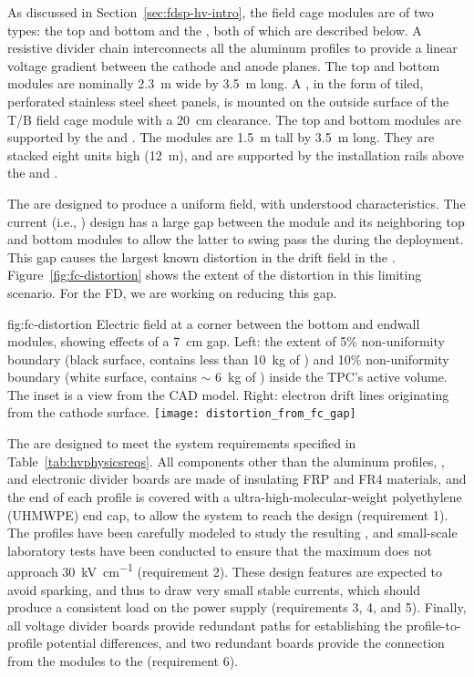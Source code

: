 As discussed in Section~\ref{sec:fdsp-hv-intro}, %
the field cage modules are of two types: the top and bottom  and the , both of which are described below. 
A resistive divider chain interconnects all the aluminum profiles to provide a linear voltage gradient between the cathode and anode planes.  The top and bottom modules are nominally \SI{2.3}{\m} wide by \SI{3.5}{\m} long. A , in the form of tiled, perforated stainless steel sheet panels, is mounted on the outside surface of the T/B field cage module with a \SI{20}{\cm} clearance. The top and bottom  modules are supported by the  and . The  modules are \SI{1.5}{\m} tall by \SI{3.5}{\m} long. They are stacked eight units high (\SI{12}{\m}), and are supported by the installation rails above the  and .

The  are designed to produce a uniform field, with understood characteristics.
The current (i.e., )  design has a large gap between the  module and its neighboring top and bottom modules to allow the latter to swing pass the  during the  deployment. This gap causes the largest known distortion in the drift field in the . Figure~\ref{fig:fc-distortion} shows the extent of the distortion in this limiting scenario. For the FD, we are working on reducing this gap.

\begin{dunefigure}
{fig:fc-distortion}
{Electric field at a corner between the bottom and endwall  modules, showing effects of a \SI{7}{cm} gap. Left: the extent of \num{5}\% \efield{} non-uniformity boundary (black surface, contains less than \SI{10}{kg} of \lar) and \num{10}\% non-uniformity boundary (white surface, contains $\sim$ \SI{6}{kg} of \lar) inside the TPC's active volume. The inset is a view from the CAD model.  Right: electron drift lines originating from the cathode surface.}
\texttt{[image: distortion\_from\_fc\_gap]}
\end{dunefigure}

The  %
are designed to %
meet the system requirements specified in Table~\ref{tab:hvphysicsreqs}. All components other than the aluminum profiles, , and electronic divider boards are made of insulating FRP and FR4 materials, and the end of each profile is covered with a ultra-high-molecular-weight polyethylene (UHMWPE) end cap, to allow the system to reach the design  \efield{} (requirement 1). The profiles have been carefully modeled to study the resulting \efield{}, and small-scale laboratory tests have been conducted to ensure that the maximum \efield{} does not approach \SI{30}{\kV\per\cm} (requirement 2). These design features are expected to avoid sparking, and thus to draw very small stable currents, which should produce a consistent load on the power supply (requirements 3, 4, and 5). Finally, all voltage divider boards provide redundant paths for establishing the profile-to-profile potential differences, and two redundant boards provide the connection from the  modules to the  (requirement 6).

